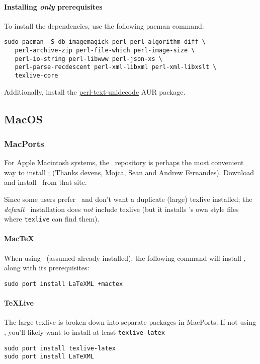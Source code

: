 \documentclass{article}
\begin{document}
\paragraph*{Installing \emph{only} prerequisites}
To install the dependencies, use the following pacman command:
\begin{lstlisting}[style=shell]
sudo pacman -S db imagemagick perl perl-algorithm-diff \
   perl-archive-zip perl-file-which perl-image-size \
   perl-io-string perl-libwww perl-json-xs \
   perl-parse-recdescent perl-xml-libxml perl-xml-libxslt \
   texlive-core
\end{lstlisting}
Additionally, install the \href{https://aur.archlinux.org/packages/perl-text-unidecode/}{perl-text-unidecode}
AUR package. 

\subsection{MacOS}\label{get.macos}

\subsubsection{MacPorts}\label{get.macos.macports}
For Apple Macintosh systems, the  \MacPorts\
repository is perhaps the most convenient way to install \LaTeXML;
(Thanks devens, Mojca, Sean and Andrew Fernandes).
Download and install \MacPorts\ from that site.

Since some users prefer \MacTeX\ and don't want a duplicate (large) texlive installed; 
the \emph{default} \LaTeXML\ installation does \emph{not} include texlive
(but it installs \LaTeXML's own style files where \texttt{texlive} can find them).

\paragraph*{MacTeX}  When using \MacTeX\ (assumed already installed),
the following command will install \LaTeXML, along with its prerequisites:
\begin{lstlisting}[style=shell]
sudo port install LaTeXML +mactex
\end{lstlisting}

\paragraph*{TeXLive}
The large texlive is broken down into separate
packages in MacPorts.  If not using \MacTeX, you'll likely want to install at
least \texttt{texlive-latex}
\begin{lstlisting}[style=shell]
sudo port install texlive-latex
sudo port install LaTeXML
\end{lstlisting}
\end{document}

